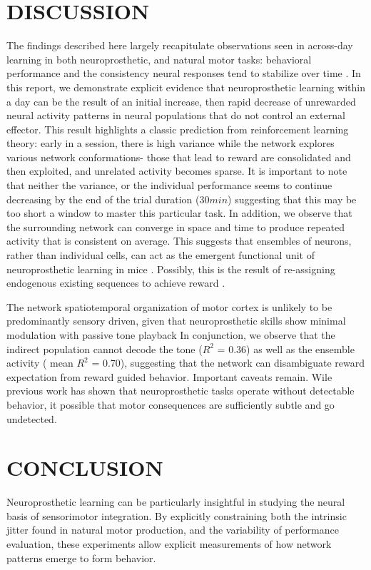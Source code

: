 \documentclass[letterpaper, 10 pt, conference]{ieeeconf}  %
\begin{document}
   \section{DISCUSSION}
The findings described here largely recapitulate observations seen in across-day learning in both neuroprosthetic, and natural motor tasks: behavioral performance and the consistency neural responses tend to stabilize over time \cite{Gulati2017-rz}. In this report, we demonstrate explicit evidence that neuroprosthetic learning within a day can be the result of an initial increase, then rapid decrease of unrewarded neural activity patterns in neural populations that do not control an external effector. This result highlights a classic prediction from reinforcement learning theory: early in a session, there is high variance while the network explores various network conformations- those that lead to reward are consolidated and then exploited, and unrelated activity becomes sparse. It is important to note that neither the variance, or the individual performance seems to continue  decreasing by the end of the trial duration (30$min$) suggesting that this may be too short a window to master this particular task. In addition, we observe that the surrounding network can converge in space and time to produce repeated activity that is consistent on average. This suggests that ensembles of neurons, rather than individual cells, can act as the emergent functional unit of neuroprosthetic learning in mice \cite{Yuste2015-or}.  Possibly, this is the result of re-assigning endogenous existing sequences to achieve reward \cite{Golub2018-qc}.
 
The network spatiotemporal organization of motor cortex is unlikely to be predominantly sensory driven, given that neuroprosthetic skills show minimal modulation with passive tone playback \cite{Neely2018-ar} In conjunction, we observe that the indirect population cannot decode the tone ($R^2$ = 0.36) as well as the ensemble activity ( mean $R^2$ = 0.70), suggesting that the network can disambiguate reward expectation from reward guided behavior. Important caveats remain.  Wile previous work has shown that neuroprosthetic tasks operate without detectable behavior, it possible that motor consequences are sufficiently subtle and go undetected. 


\section{CONCLUSION}

Neuroprosthetic learning can be particularly insightful in studying the neural basis of sensorimotor integration. By explicitly constraining both the intrinsic jitter found in natural motor production, and the variability of performance evaluation, these experiments allow explicit measurements of how network patterns emerge to form behavior.
\end{document}

